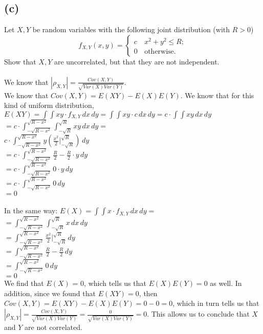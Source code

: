 \documentclass{article}
\begin{document}
{\subsection*{(c)}
Let $X,Y$ be random variables with the following joint
distribution (with $R>0$)
\[
f_{X,Y}\left(x,y\right)=\begin{cases}
c & \,x^{2}+y^{2}\le R;\\
0 & \,\mbox{otherwise}.
\end{cases}
\]
Show that $X,Y$ are uncorrelated, but that they are not independent. \\ \\
We know that $|\rho_{X, Y}| = \frac{Cov(X, Y)}{\sqrt{Var(X)Var(Y)}}$. \\ 
We know that $Cov(X, Y) = E(XY) - E(X)E(Y)$. We know that for this kind of uniform distribution, $E(XY) = \int \int xy \cdot f_{X, Y} \,dx \,dy = \int \int xy \cdot c \,dx \,dy = c \cdot \int \int xy \,dx \,dy$ \\ 
$ = c \cdot \int_{-\sqrt{R-x^2}}^{\sqrt{R-x^2}} \int_{-\sqrt{R}}^{\sqrt{R}} xy \,dx \,dy =$ \\ 
$ c \cdot \int_{-\sqrt{R-x^2}}^{\sqrt{R-x^2}} y (\frac{x^2}{2} |_{-\sqrt{R}}^{\sqrt{R}}) \,dy$ \\ 
$ = c \cdot \int_{-\sqrt{R-x^2}}^{\sqrt{R-x^2}} \frac{R}{2} - \frac{R}{2} \cdot y \,dy$ \\
$ = c \cdot \int_{-\sqrt{R-x^2}}^{\sqrt{R-x^2}} 0 \cdot y \,dy$ \\
$ = c \cdot \int_{-\sqrt{R-x^2}}^{\sqrt{R-x^2}} 0\,dy$ \\
$ = 0$ \\ \\ 
In the same way: $E(X) = \int \int x \cdot f_{X, Y} \,dx \,dy = $ \\ 
$= \int_{-\sqrt{R-x^2}}^{\sqrt{R-x^2}} \int_{-\sqrt{R}}^{\sqrt{R}} x \,dx \,dy $ \\ 
$= \int_{-\sqrt{R-x^2}}^{\sqrt{R-x^2}} \frac{x^2}{2} |_{-\sqrt{R}}^{\sqrt{R}} \,dy $ \\ 
$= \int_{-\sqrt{R-x^2}}^{\sqrt{R-x^2}} \frac{R}{2} - \frac{R}{2} \,dy $ \\ 
$= \int_{-\sqrt{R-x^2}}^{\sqrt{R-x^2}} 0 \,dy $ \\ 
$= 0$ \\ 
We find that $E(X)$ = 0, which tells us that $E(X)E(Y) = 0$ as well. In addition, since we found that $E(XY) = 0$, then $Cov(X,Y) = E(XY) - E(X)E(Y) = 0 - 0 = 0$, which in turn tells us that $|\rho_{X, Y}| = \frac{Cov(X, Y)}{\sqrt{Var(X)Var(Y)}} = \frac{0}{\sqrt{Var(X)Var(Y)}} = 0$. This allows us to conclude that $X$ and $Y$ are not correlated. \\ \\
}
\end{document}

